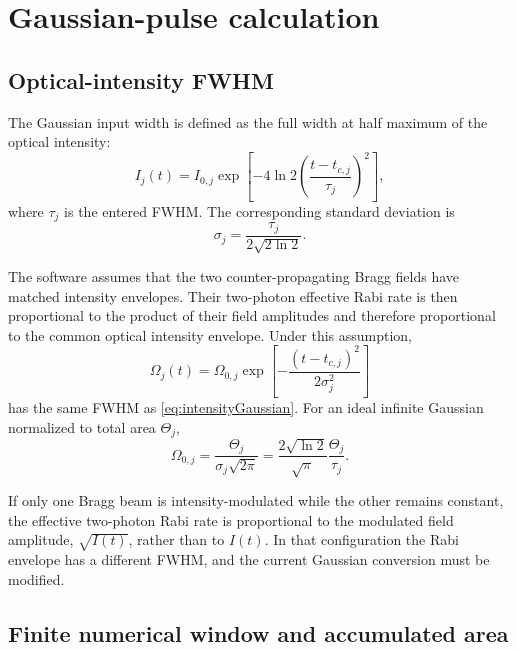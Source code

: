 \documentclass[11pt,a4paper]{article}
\begin{document}
\section{Gaussian-pulse calculation}

\subsection{Optical-intensity FWHM}

The Gaussian input width is defined as the full width at half maximum of the optical intensity:
\begin{equation}
I_j(t)=I_{0,j}\exp\left[-4\ln2\left(\frac{t-t_{c,j}}{\tau_j}\right)^2\right],
\label{eq:intensityGaussian}
\end{equation}
where $\tau_j$ is the entered FWHM. The corresponding standard deviation is
\begin{equation}
\sigma_j=\frac{\tau_j}{2\sqrt{2\ln2}}.
\end{equation}

The software assumes that the two counter-propagating Bragg fields have matched intensity envelopes. Their two-photon effective Rabi rate is then proportional to the product of their field amplitudes and therefore proportional to the common optical intensity envelope. Under this assumption,
\begin{equation}
\Omega_j(t)=\Omega_{0,j}\exp\left[-\frac{(t-t_{c,j})^2}{2\sigma_j^2}\right]
\end{equation}
has the same FWHM as \cref{eq:intensityGaussian}. For an ideal infinite Gaussian normalized to total area $\Theta_j$,
\begin{equation}
\boxed{\Omega_{0,j}=\frac{\Theta_j}{\sigma_j\sqrt{2\pi}}
=\frac{2\sqrt{\ln2}}{\sqrt{\pi}}\frac{\Theta_j}{\tau_j}.}
\label{eq:gaussianPeak}
\end{equation}

\begin{warningbox}
If only one Bragg beam is intensity-modulated while the other remains constant, the effective two-photon Rabi rate is proportional to the modulated field amplitude, $\sqrt{I(t)}$, rather than to $I(t)$. In that configuration the Rabi envelope has a different FWHM, and the current Gaussian conversion must be modified.
\end{warningbox}

\subsection{Finite numerical window and accumulated area}
\end{document}
